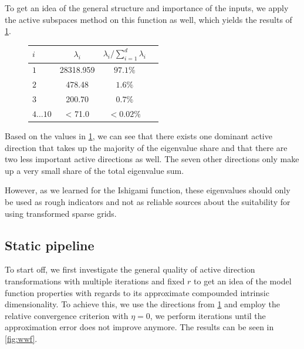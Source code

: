 \documentclass[
  a4paper,  %
  twoside,  %
  bibliography=totoc,
  headsepline,
  cleardoublepage=empty,
  parskip=half,
  draft=false
]{scrbook}
\begin{document}
%
To get an idea of the general structure and importance of the inputs, we apply the active subspaces method on this function as well, which yields the results of \cref{tab:ww_as}.
\begin{mdframed}[style=style]
\begin{figure}[H]
\vspace{-2mm}
\centering
\bgroup
\def\arraystretch{1.2}%
  \begin{tabular}{ l | c c c}
$i$ & $\lambda_i$ & $\lambda_i / \sum_{i=1}^d \lambda_i$\\
\hline
$1$  & 28318.959 & $97.1\%$\\
$2$   & 478.48 & $1.6\%$\\
$3$  & 200.70 & $0.7\%$\\
$4 \dots 10$  & < 71.0 & $< 0.02\%$\\
\end{tabular}
\egroup
\vspace{0.5em}

\delimit

\label{tab:ww_as}
\end{figure}
\end{mdframed}
%
Based on the values in \cref{tab:ww_as}, we can see that there exists one dominant active direction that takes up the majority of the eigenvalue share and that there are two less important active directions as well.
The seven other directions only make up a very small share of the total eigenvalue sum.

\noindent However, as we learned for the Ishigami function, these eigenvalues should only be used as rough indicators and not as reliable sources about the suitability for using transformed sparse grids.

\subsection{Static pipeline}

To start off, we first investigate the general quality of active direction transformations with multiple iterations and fixed $r$ to get an idea of the model function properties with regards to its approximate compounded intrinsic dimensionality.
To achieve this, we use the directions from \cref{tab:ww_as} and employ the relative convergence criterion with $\eta=0$, \ie we perform iterations until the approximation error does not improve anymore.
The results can be seen in \cref{fig:wwf}.
\end{document}
